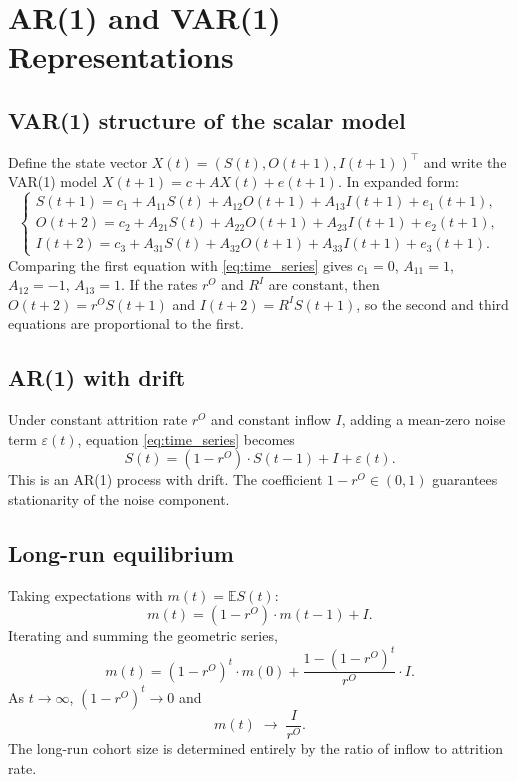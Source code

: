 \documentclass[a4paper,oneside,12pt]{extarticle}
\theoremstyle{plain}
\theoremstyle{definition}
\theoremstyle{remark}
\newcommand*{\ve}{\varepsilon}
\newcommand*{\E}{\mathbb{E}}
\begin{document}
\section{AR(1) and VAR(1) Representations}
\label{sec:ar1}

\subsection{VAR(1) structure of the scalar model}

Define the state vector $X(t) = (S(t), O(t+1), I(t+1))^\top$ and write
the VAR(1) model $X(t+1) = c + AX(t) + e(t+1)$. In expanded form:
\[
\begin{cases}
S(t+1) = c_1 + A_{11}S(t) + A_{12}O(t+1) + A_{13}I(t+1) + e_1(t+1),\\
O(t+2) = c_2 + A_{21}S(t) + A_{22}O(t+1) + A_{23}I(t+1) + e_2(t+1),\\
I(t+2) = c_3 + A_{31}S(t) + A_{32}O(t+1) + A_{33}I(t+1) + e_3(t+1).
\end{cases}
\]
Comparing the first equation with \eqref{eq:time_series} gives
$c_1 = 0$, $A_{11} = 1$, $A_{12} = -1$, $A_{13} = 1$.
If the rates $r^O$ and $R^I$ are constant, then
$O(t+2) = r^O S(t+1)$ and $I(t+2) = R^I S(t+1)$, so the second and
third equations are proportional to the first.

\subsection{AR(1) with drift}

Under constant attrition rate $r^O$ and constant inflow $I$, adding a
mean-zero noise term $\ve(t)$, equation \eqref{eq:time_series} becomes
\begin{equation}
\label{eq:ar1_drift}
S(t) = (1-r^O)\cdot S(t-1) + I + \ve(t).
\end{equation}
This is an AR(1) process with drift. The coefficient $1-r^O \in (0,1)$
guarantees stationarity of the noise component.

\subsection{Long-run equilibrium}

Taking expectations with $m(t) = \E S(t)$:
\[
m(t) = (1-r^O)\cdot m(t-1) + I.
\]
Iterating and summing the geometric series,
\[
m(t) = (1-r^O)^t\cdot m(0) + \frac{1-(1-r^O)^t}{r^O}\cdot I.
\]
As $t \to \infty$, $(1-r^O)^t \to 0$ and
\[
m(t) \;\to\; \frac{I}{r^O}.
\]
The long-run cohort size is determined entirely by the ratio of inflow to
attrition rate.
\end{document}
